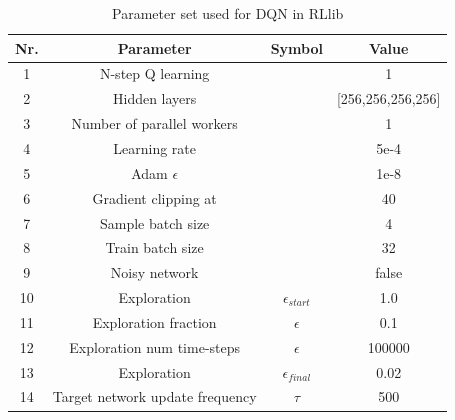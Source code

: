 \documentclass[12pt,a4paper]{article}
\begin{document}
\begin{table}
    \begin{center}
        \begin{tabular}{| c | c | c |c |}
            \hline
            Nr. & {\bf Parameter} & {\bf Symbol} & {\bf Value} \\
            \hline
            \hline
            1 & N-step Q learning & & 1 \\
            \hline
            2 & Hidden layers & & [256,256,256,256] \\
            \hline
            3 & Number of parallel workers & & 1 \\
            \hline
            \hline
            4 & Learning rate & & 5e-4 \\
            \hline
            5 &Adam $\epsilon$ & & 1e-8 \\
            \hline
            6 & Gradient clipping at & & 40 \\
            \hline
            7 & Sample batch size & & 4 \\
            \hline
            8 & Train batch size & & 32 \\
            \hline
            9 & Noisy network & & false \\
            \hline
            \hline
            10 & Exploration  & $\epsilon_{start}$ & 1.0 \\
            \hline
            11 & Exploration  fraction & $\epsilon$ & 0.1 \\
            \hline
            12 & Exploration  num time-steps & $\epsilon$ & 100000 \\
            \hline
            13 & Exploration  & $\epsilon_{final}$ & 0.02 \\
            \hline
            14 & Target network update frequency & $\tau$ & 500 \\
            \hline
        \end{tabular}
        \caption{Parameter set used for DQN in RLlib}
        \label{tab:dqn_params}
    \end{center}
\end{table} 
\end{document}
